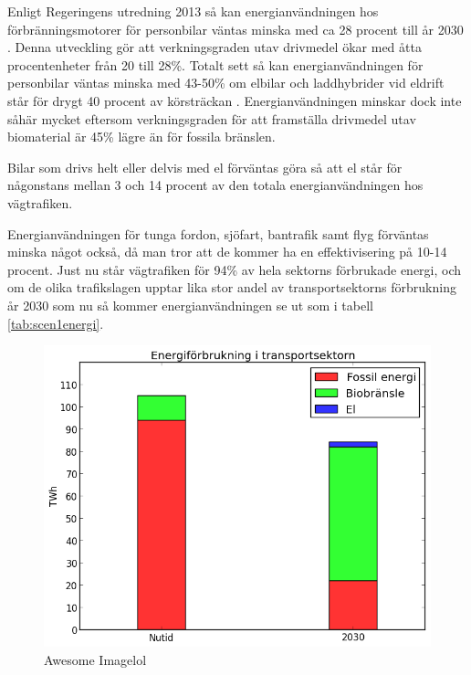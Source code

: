 \documentclass[a4paper,11pt,fleqn, titlepage]{article}
\begin{document}
Enligt Regeringens utredning 2013 så kan energianvändningen hos
förbränningsmotorer för personbilar väntas minska med ca 28 procent till år
2030 \cite{fossilfrihet}. Denna utveckling gör att verkningsgraden utav
drivmedel ökar med åtta procentenheter från 20 till 28\%.  Totalt sett så
kan energianvändningen för personbilar väntas minska med 43-50\% om elbilar
och laddhybrider vid eldrift står för drygt 40 procent av körsträckan
\cite{fossilfrihet}.  Energianvändningen minskar dock inte såhär mycket 
eftersom verkningsgraden för att framställa drivmedel utav biomaterial
är 45\% lägre än för fossila bränslen.

Bilar som drivs helt eller delvis med el förväntas göra så att el står för
någonstans mellan 3 och 14 procent av den totala energianvändningen hos
vägtrafiken.

Energianvändningen för tunga fordon, sjöfart, bantrafik samt flyg förväntas
minska något också, då man tror att de kommer ha en effektivisering på 10-14 procent.
Just nu står vägtrafiken för 94\% av hela sektorns förbrukade energi, och
om de olika trafikslagen upptar lika stor andel av transportsektorns
förbrukning år 2030 som nu så kommer energianvändningen se ut som i tabell
\ref{tab:scen1energi}.

\begin{figure}[h!]
       \centering
       \includegraphics[scale=0.7]{scen1a1transport.png}
       \caption{Awesome Imagelol}
       \label{fig:awesome_image}
\end{figure}
\end{document}
